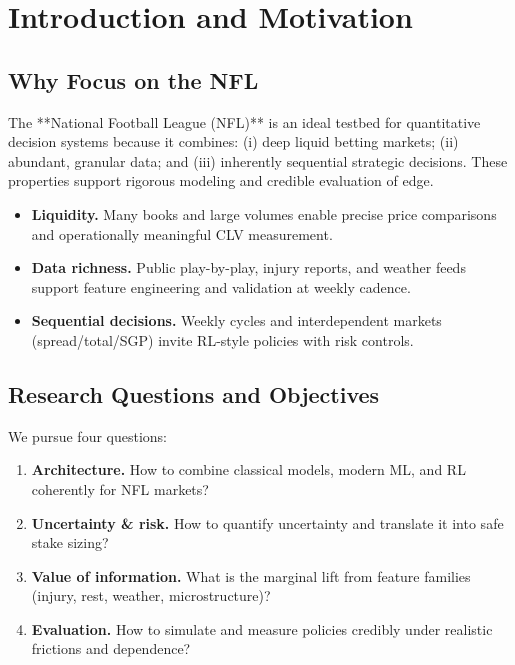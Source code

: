 \chapter{Introduction and Motivation}
\label{chap:intro}

\section{Why Focus on the NFL}

The **National Football League (NFL)** is an ideal testbed for quantitative decision systems because it combines: (i) deep liquid betting markets; (ii) abundant, granular data; and (iii) inherently sequential strategic decisions. These properties support rigorous modeling and credible evaluation of edge.

\begingroup\RaggedRight\sloppy{}
\begin{itemize}
  \item \textbf{Liquidity.} Many books and large volumes enable precise price comparisons and operationally meaningful CLV measurement.
  \item \textbf{Data richness.} Public play-by-play, injury reports, and weather feeds support feature engineering and validation at weekly cadence.
  \item \textbf{Sequential decisions.} Weekly cycles and interdependent markets (spread/total/SGP) invite RL-style policies with risk controls.
\end{itemize}
\endgroup

\section{Research Questions and Objectives}

We pursue four questions:
\begin{enumerate}
  \item \textbf{Architecture.} How to combine classical models, modern ML, and RL coherently for NFL markets?
  \item \textbf{Uncertainty \& risk.} How to quantify uncertainty and translate it into safe stake sizing?
  \item \textbf{Value of information.} What is the marginal lift from feature families (injury, rest, weather, microstructure)?
  \item \textbf{Evaluation.} How to simulate and measure policies credibly under realistic frictions and dependence?
\end{enumerate}

